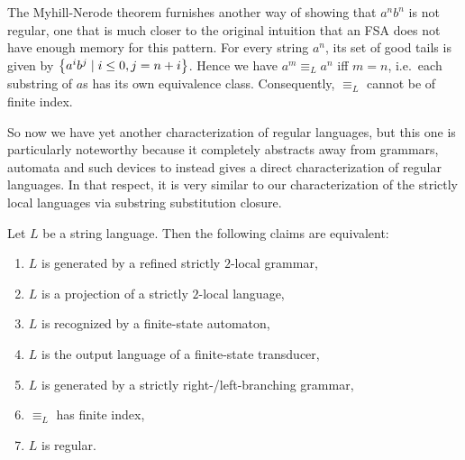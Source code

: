 The Myhill-Nerode theorem furnishes another way of showing that $a^n b^n$ is not regular, one that is much closer to the original intuition that an FSA does not have enough memory for this pattern.
For every string $a^n$, its set of good tails is given by $\left \{ a^i b^j \mid i \leq 0, j = n+i \right \}$.
Hence we have $a^m \equiv_L a^n$ iff $m = n$, i.e.\ each substring of $a$s has its own equivalence class.
Consequently, $\equiv_L$ cannot be of finite index.

So now we have yet another characterization of regular languages, but this one is particularly noteworthy because it completely abstracts away from grammars, automata and such devices to instead gives a direct characterization of regular languages. 
In that respect, it is very similar to our characterization of the strictly local languages via substring substitution closure.
%
\begin{corollary}
    Let $L$ be a string language.
    Then the following claims are equivalent:
    \begin{enumerate}
        \item $L$ is generated by a refined strictly $2$-local grammar,
        \item $L$ is a projection of a strictly $2$-local language,
        \item $L$ is recognized by a finite-state automaton,
        \item $L$ is the output language of a finite-state transducer,
        \item $L$ is generated by a strictly right-\slash left-branching grammar,
        \item $\equiv_L$ has finite index,
        \item $L$ is regular.
    \end{enumerate}
\end{corollary}


